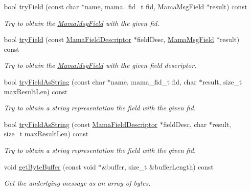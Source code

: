 \begin{DoxyCompactItemize}
bool \hyperlink{classWombat_1_1MamaMsg_af2171e1fdddaef8d38394028b227c5e6}{tryField} (const char $\ast$name, mama\_\-fid\_\-t fid, \hyperlink{classWombat_1_1MamaMsgField}{MamaMsgField} $\ast$result) const 
\begin{DoxyCompactList}\small\item\em Try to obtain the \hyperlink{classWombat_1_1MamaMsgField}{MamaMsgField} with the given fid. \item\end{DoxyCompactList}\item 
bool \hyperlink{classWombat_1_1MamaMsg_a52324667b6a7da49b31bb0c490fd9535}{tryField} (const \hyperlink{classWombat_1_1MamaFieldDescriptor}{MamaFieldDescriptor} $\ast$fieldDesc, \hyperlink{classWombat_1_1MamaMsgField}{MamaMsgField} $\ast$result) const 
\begin{DoxyCompactList}\small\item\em Try to obtain the \hyperlink{classWombat_1_1MamaMsgField}{MamaMsgField} with the given field descriptor. \item\end{DoxyCompactList}\item 
bool \hyperlink{classWombat_1_1MamaMsg_a7df22f1047cf64ebeb464face478bda5}{tryFieldAsString} (const char $\ast$name, mama\_\-fid\_\-t fid, char $\ast$result, size\_\-t maxResultLen) const 
\begin{DoxyCompactList}\small\item\em Try to obtain a string representation the field with the given fid. \item\end{DoxyCompactList}\item 
bool \hyperlink{classWombat_1_1MamaMsg_a2d08a4d75c1d7ee68a2001581c33bf6b}{tryFieldAsString} (const \hyperlink{classWombat_1_1MamaFieldDescriptor}{MamaFieldDescriptor} $\ast$fieldDesc, char $\ast$result, size\_\-t maxResultLen) const 
\begin{DoxyCompactList}\small\item\em Try to obtain a string representation the field with the given fid. \item\end{DoxyCompactList}\item 
void \hyperlink{classWombat_1_1MamaMsg_ae632d484473700395069b3454598d9b0}{getByteBuffer} (const void $\ast$\&buffer, size\_\-t \&bufferLength) const 
\begin{DoxyCompactList}\small\item\em Get the underlying message as an array of bytes. \item\end{DoxyCompactList}\item 

\end{DoxyCompactItemize}
